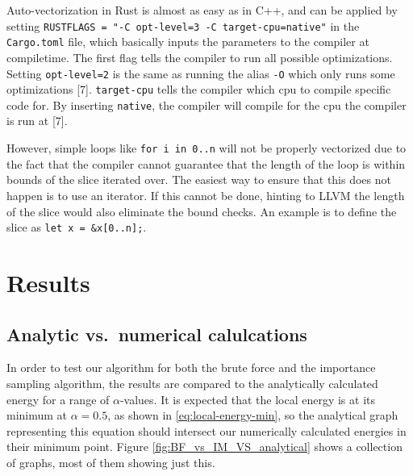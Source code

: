 \documentclass[
]{article}
\begin{document}
Auto-vectorization in Rust is almost as easy as in C++, and can be
applied by setting
\texttt{RUSTFLAGS\ =\ "-C\ opt-level=3\ -C\ target-cpu=native"} in the
\texttt{Cargo.toml} file, which basically inputs the parameters to the
compiler at compiletime. The first flag tells the compiler to run all
possible optimizations. Setting \texttt{opt-level=2} is the same as
running the alias \texttt{-O} which only runs some optimizations
{[}7{]}. \texttt{target-cpu} tells the compiler which cpu to compile
specific code for. By inserting \texttt{native}, the compiler will
compile for the cpu the compiler is run at {[}7{]}.

However, simple loops like \texttt{for\ i\ in\ 0..n} will not be
properly vectorized due to the fact that the compiler cannot guarantee
that the length of the loop is within bounds of the slice iterated over.
The easiest way to ensure that this does not happen is to use an
iterator. If this cannot be done, hinting to LLVM the length of the
slice would also eliminate the bound checks. An example is to define the
slice as \texttt{let\ x\ =\ \&x{[}0..n{]};}.

\hypertarget{results}{%
\section{Results}\label{results}}

\hypertarget{analytic-vs.-numerical-calulcations}{%
\subsection{Analytic vs.~numerical
calulcations}\label{analytic-vs.-numerical-calulcations}}

In order to test our algorithm for both the brute force and the
importance sampling algorithm, the results are compared to the
analytically calculated energy for a range of \(\alpha\)-values. It is
expected that the local energy is at its minimum at \(\alpha = 0.5\), as
shown in \eqref{eq:local-energy-min}, so the analytical graph
representing this equation should intersect our numerically calculated
energies in their minimum point. Figure \ref{fig:BF_vs_IM_VS_analytical}
shows a collection of graphs, most of them showing just this.
\end{document}
